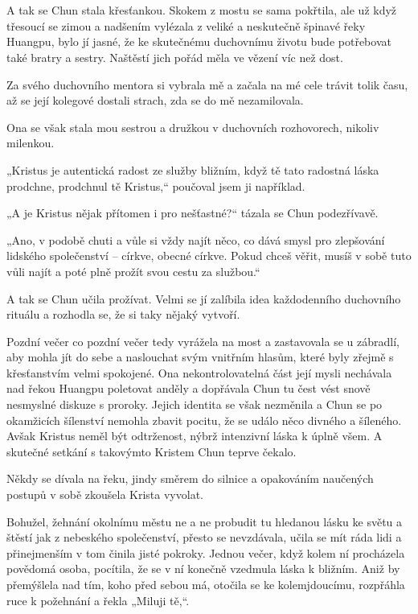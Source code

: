 \chapter{}

A tak se Chun stala křesťankou. Skokem z mostu se sama pokřtila, ale už když třesoucí se zimou a nadšením vylézala z veliké a neskutečně špinavé řeky Huangpu, bylo jí jasné, že ke skutečnému duchovnímu životu bude potřebovat také bratry a sestry. Naštěstí jich pořád měla ve vězení víc než dost. 

Za svého duchovního mentora si vybrala mě a začala na mé cele trávit tolik času, až se její kolegové dostali strach, zda se do mě nezamilovala.

Ona se však stala mou sestrou a družkou v duchovních rozhovorech, nikoliv milenkou.

„Kristus je autentická radost ze služby bližním, když tě tato radostná láska prodchne, prodchnul tě Kristus,“ poučoval jsem ji například.

„A je Kristus nějak přítomen i pro nešťastné?“ tázala se Chun podezřívavě.

„Ano, v podobě chuti a vůle si vždy najít něco, co dává smysl pro zlepšování lidského společenství – církve, obecné církve. Pokud chceš věřit, musíš v sobě tuto vůli najít a poté plně prožít svou cestu za službou.“

A tak se Chun učila prožívat. Velmi se jí zalíbila idea každodenního duchovního rituálu a rozhodla se, že si taky nějaký vytvoří. 

Pozdní večer co pozdní večer tedy vyrážela na most a zastavovala se u zábradlí, aby mohla jít do sebe a naslouchat svým vnitřním hlasům, které byly zřejmě s křesťanstvím velmi spokojené. Ona nekontrolovatelná část její mysli nechávala nad řekou Huangpu poletovat anděly a dopřávala Chun tu čest vést snově nesmyslné diskuze s proroky. Jejich identita se však nezměnila a Chun se po okamžicích šílenství nemohla zbavit pocitu, že se událo něco divného a šíleného. Avšak Kristus neměl být odtrženost, nýbrž intenzivní láska k úplně všem. A skutečné setkání s takovýmto Kristem Chun teprve čekalo. 

Někdy se dívala na řeku, jindy směrem do silnice a opakováním naučených postupů v sobě zkoušela Krista vyvolat. 

Bohužel, žehnání okolnímu městu ne a ne probudit tu hledanou lásku ke světu a štěstí jak z nebeského společenství, přesto se nevzdávala, učila se mít ráda lidi a přinejmenším v tom činila jisté pokroky. Jednou večer, když kolem ní procházela povědomá osoba, pocítila, že se v ní konečně vzedmula láska k bližním. Aniž by přemýšlela nad tím, koho před sebou má, otočila se ke kolemjdoucímu, rozpřáhla ruce k požehnání a řekla „Miluji tě,“.

